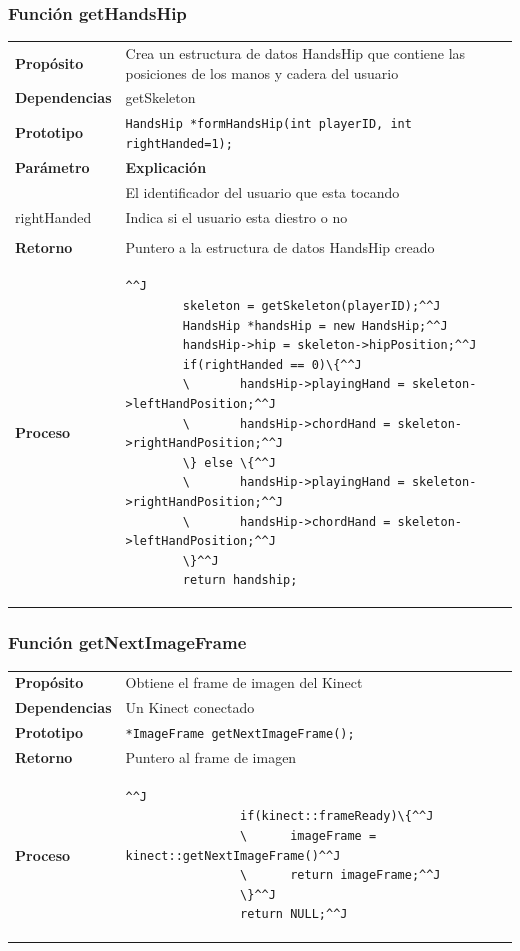\documentclass[a4paper,10pt]{article}
\begin{document}
\subsubsection{Función getHandsHip}
\begin{tabularx}{\textwidth}{p{25mm} X}
        \textbf{Propósito} & Crea un estructura de datos HandsHip que contiene
        las posiciones de los manos y cadera del usuario\\
        \textbf{Dependencias} & getSkeleton\\
        \textbf{Prototipo} & \lstinline{HandsHip *formHandsHip(int playerID, int rightHanded=1);}\\
        \textbf{Parámetro} & \textbf{Explicación} \\
        \begin{tabular}{p{2cm} l}
                playerID & El identificador del usuario que esta tocando \\
                rightHanded & Indica si el usuario esta diestro o no \\
        \end{tabular} \\

        \textbf{Retorno} & Puntero a la estructura de datos HandsHip creado\\
        \textbf{Proceso} & 
        \begin{lstlisting}^^J
        skeleton = getSkeleton(playerID);^^J
        HandsHip *handsHip = new HandsHip;^^J
        handsHip->hip = skeleton->hipPosition;^^J
        if(rightHanded == 0)\{^^J
        \       handsHip->playingHand = skeleton->leftHandPosition;^^J
        \       handsHip->chordHand = skeleton->rightHandPosition;^^J
        \} else \{^^J
        \       handsHip->playingHand = skeleton->rightHandPosition;^^J
        \       handsHip->chordHand = skeleton->leftHandPosition;^^J
        \}^^J
        return handship;
        \end{lstlisting} \\
\end{tabularx}

\subsubsection{Función getNextImageFrame}
\begin{tabularx}{\textwidth}{p{25mm} X}
        \textbf{Propósito} & Obtiene el frame de imagen del Kinect \\
        \textbf{Dependencias} & Un Kinect conectado \\
        \textbf{Prototipo} & \lstinline{*ImageFrame getNextImageFrame();}\\
        \textbf{Retorno} & Puntero al frame de imagen \\
        \textbf{Proceso} & 
        \begin{lstlisting}^^J
                if(kinect::frameReady)\{^^J
                \      imageFrame = kinect::getNextImageFrame()^^J
                \      return imageFrame;^^J
                \}^^J
                return NULL;^^J
        \end{lstlisting} \\
\end{tabularx}
\end{document}
